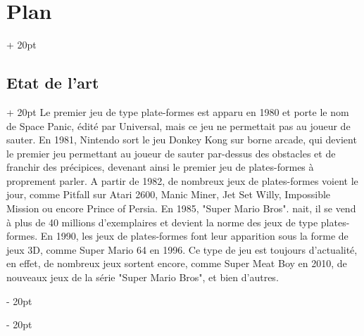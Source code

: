 \documentclass[a4paper, 12pt, twoside]{article}
\newcommand{\ind}[1][20pt]{\advance\leftskip + #1}
\newcommand{\deind}[1][20pt]{\advance\leftskip - #1}
\newenvironment{indt}[2][20pt]{#2 \par \ind[#1]}{\par \deind} %
\begin{document}
\begin{indt}{\section{Plan}}
        \begin{indt}{\subsection{Etat de l'art}}
            Le premier jeu de type plate-formes est apparu en 1980 et porte le nom de Space Panic, édité par Universal, mais ce jeu ne permettait pas au joueur de sauter. En 1981, Nintendo sort le jeu Donkey Kong sur borne arcade, qui devient le premier jeu permettant au joueur de sauter par-dessus des obstacles et de franchir des précipices, devenant ainsi le premier jeu de plates-formes à proprement parler. A partir de 1982, de nombreux jeux de plates-formes voient le jour, comme Pitfall sur Atari 2600, Manic Miner, Jet Set Willy, Impossible Mission ou encore Prince of Persia. En 1985, "Super Mario Bros". nait, il se vend à plus de 40 millions d'exemplaires et devient la norme des jeux de type plates-formes. En 1990, les jeux de plates-formes font leur apparition sous la forme de jeux 3D, comme Super Mario 64 en 1996. Ce type de jeu est toujours d'actualité, en effet, de nombreux jeux sortent encore, comme Super Meat Boy en 2010, de nouveaux jeux de la série "Super Mario Bros", et bien d'autres.
        \end{indt}

        \newpage
        

\end{indt}
\end{document}
